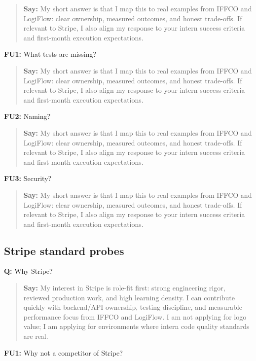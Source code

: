 \documentclass[9pt,a4paper]{article}
\begin{document}
\begin{quote}\small\textbf{Say:} My short answer is that I map this to real examples from IFFCO and LogiFlow: clear ownership, measured outcomes, and honest trade-offs. If relevant to Stripe, I also align my response to your intern success criteria and first-month execution expectations.\end{quote}
\vspace{2mm}
\textbf{FU1:} What tests are missing?

\begin{quote}\small\textbf{Say:} My short answer is that I map this to real examples from IFFCO and LogiFlow: clear ownership, measured outcomes, and honest trade-offs. If relevant to Stripe, I also align my response to your intern success criteria and first-month execution expectations.\end{quote}
\vspace{2mm}
\textbf{FU2:} Naming?

\begin{quote}\small\textbf{Say:} My short answer is that I map this to real examples from IFFCO and LogiFlow: clear ownership, measured outcomes, and honest trade-offs. If relevant to Stripe, I also align my response to your intern success criteria and first-month execution expectations.\end{quote}
\vspace{2mm}
\textbf{FU3:} Security?

\begin{quote}\small\textbf{Say:} My short answer is that I map this to real examples from IFFCO and LogiFlow: clear ownership, measured outcomes, and honest trade-offs. If relevant to Stripe, I also align my response to your intern success criteria and first-month execution expectations.\end{quote}
\vspace{2mm}
\subsection{Stripe standard probes}
\textbf{Q:} Why Stripe?

\begin{quote}\small\textbf{Say:} My interest in Stripe is role-fit first: strong engineering rigor, reviewed production work, and high learning density. I can contribute quickly with backend/API ownership, testing discipline, and measurable performance focus from IFFCO and LogiFlow. I am not applying for logo value; I am applying for environments where intern code quality standards are real.\end{quote}
\vspace{2mm}
\textbf{FU1:} Why not a competitor of Stripe?
\end{document}
